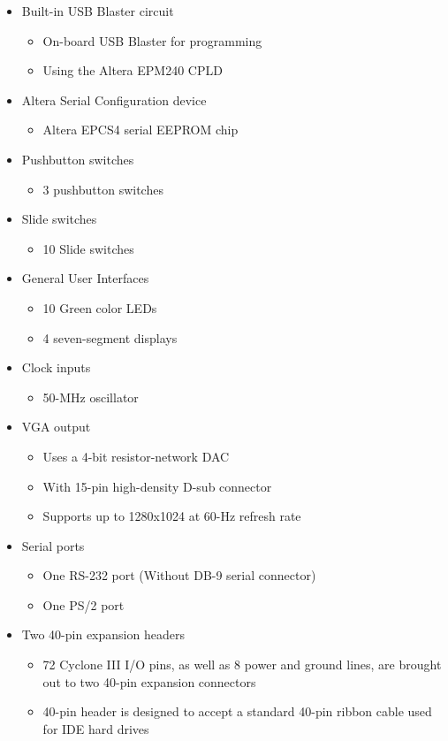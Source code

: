 \documentclass[11pt,peerreview, onecolumn]{IEEEtran}
\begin{document}
\begin{itemize}
\begin{itemize}
	\item Built-in USB Blaster circuit
		\begin{itemize}
	 	\item On-board USB Blaster for programming
		\item Using the Altera EPM240 CPLD
		\end{itemize}
	\item Altera Serial Configuration device
		\begin{itemize}
		\item Altera EPCS4 serial EEPROM chip
		\end{itemize}
	\item Pushbutton switches
		\begin{itemize}
		\item 3 pushbutton switches
		\end{itemize}
	\item Slide switches
		\begin{itemize}
		\item 10 Slide switches
		\end{itemize}
	\item General User Interfaces
		\begin{itemize}
		\item 10 Green color LEDs
		\item 4 seven-segment displays
		\end{itemize}
	\item Clock inputs
		\begin{itemize}
		\item 50-MHz oscillator
		\end{itemize}
	\item VGA output
		\begin{itemize}
		\item Uses a 4-bit resistor-network DAC
		\item With 15-pin high-density D-sub connector
		\item Supports up to 1280x1024 at 60-Hz refresh rate
		\end{itemize}
	\item Serial ports
		\begin{itemize}
		\item One RS-232 port (Without DB-9 serial connector)
		\item One PS/2 port
		\end{itemize}
	\item Two 40-pin expansion headers
		\begin{itemize}
		\item 72 Cyclone III I/O pins, as well as 8 power and ground lines, are brought out to two 40-pin expansion connectors
		\item40-pin header is designed to accept a standard 40-pin ribbon cable used for IDE hard drives 
		\end{itemize}
	\end{itemize}
\end{itemize}
\end{document}
